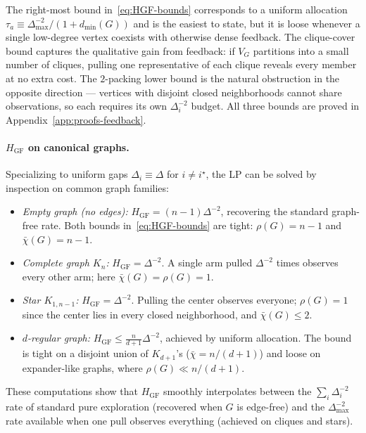 \documentclass{article}
\begin{document}
The right-most bound in~\eqref{eq:HGF-bounds} corresponds to a uniform allocation $\tau_a\equiv\Delta_{\max}^{-2}/(1+d_{\min}(G))$ and is the easiest to state, but it is loose whenever a single low-degree vertex coexists with otherwise dense feedback.
The clique-cover bound captures the qualitative gain from feedback: if $V_G$ partitions into a small number of cliques, pulling one representative of each clique reveals every member at no extra cost.
The $2$-packing lower bound is the natural obstruction in the opposite direction --- vertices with disjoint closed neighborhoods cannot share observations, so each requires its own $\Delta_i^{-2}$ budget. All three bounds are proved in Appendix~\ref{app:proofs-feedback}.

\paragraph{$H_{\mathrm{GF}}$ on canonical graphs.}
Specializing to uniform gaps $\Delta_i\equiv\Delta$ for $i\neq i^\star$, the LP can be solved by inspection on common graph families:
\begin{itemize}[leftmargin=*,itemsep=2pt,topsep=2pt]
\item \emph{Empty graph (no edges):} $H_{\mathrm{GF}}=(n-1)\Delta^{-2}$, recovering the standard graph-free rate. Both bounds in~\eqref{eq:HGF-bounds} are tight: $\rho(G)=n-1$ and $\bar\chi(G)=n-1$.
\item \emph{Complete graph $K_n$:} $H_{\mathrm{GF}}=\Delta^{-2}$. A single arm pulled $\Delta^{-2}$ times observes every other arm; here $\bar\chi(G)=\rho(G)=1$.
\item \emph{Star $K_{1,n-1}$:} $H_{\mathrm{GF}}=\Delta^{-2}$. Pulling the center observes everyone; $\rho(G)=1$ since the center lies in every closed neighborhood, and $\bar\chi(G)\le 2$.
\item \emph{$d$-regular graph:} $H_{\mathrm{GF}}\le \frac{n}{d+1}\Delta^{-2}$, achieved by uniform allocation. The bound is tight on a disjoint union of $K_{d+1}$'s ($\bar\chi=n/(d+1)$) and loose on expander-like graphs, where $\rho(G)\ll n/(d+1)$.
\end{itemize}
These computations show that $H_{\mathrm{GF}}$ smoothly interpolates between the $\sum_i\Delta_i^{-2}$ rate of standard pure exploration (recovered when $G$ is edge-free) and the $\Delta_{\max}^{-2}$ rate available when one pull observes everything (achieved on cliques and stars).
\end{document}
